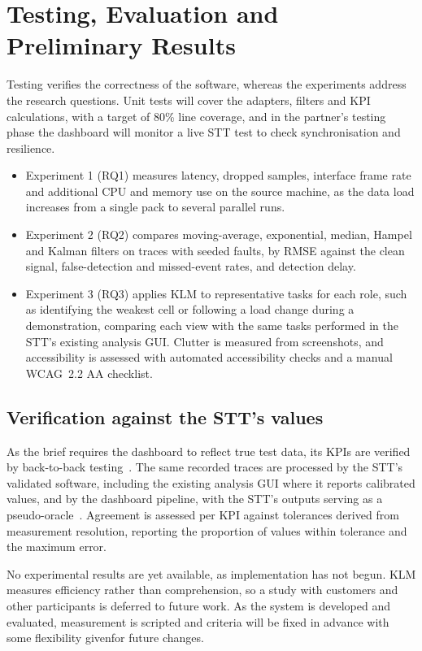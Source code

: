 \section{Testing, Evaluation and Preliminary Results}
\label{sec:evaluation}

Testing verifies the correctness of the software, whereas the experiments address the research questions.
Unit tests will cover the adapters, filters and KPI calculations, with a target of 80\% line coverage, and in the partner's testing phase the dashboard will monitor a live STT test to check synchronisation and resilience.

\begin{itemize}
    \item Experiment 1 (RQ1) measures latency, dropped samples, interface frame rate and additional CPU and memory use on the source machine, as the data load increases from a single pack to several parallel runs.
    \item Experiment 2 (RQ2) compares moving-average, exponential, median, Hampel and Kalman filters on traces with seeded faults, by RMSE against the clean signal, false-detection and missed-event rates, and detection delay.
    \item Experiment 3 (RQ3) applies KLM to representative tasks for each role, such as identifying the weakest cell or following a load change during a demonstration, comparing each view with the same tasks performed in the STT's existing analysis GUI\@.
    Clutter is measured from screenshots, and accessibility is assessed with automated accessibility checks and a manual WCAG~2.2 AA checklist.
\end{itemize}

\subsection{Verification against the STT's values}\label{subsec:kpi-verification}
As the brief requires the dashboard to reflect true test data, its KPIs are verified by back-to-back testing~\cite{vouk1990backtoback}.
The same recorded traces are processed by the STT's validated software, including the existing analysis GUI where it reports calibrated values, and by the dashboard pipeline, with the STT's outputs serving as a pseudo-oracle~\cite{barr2015oracle}.
Agreement is assessed per KPI against tolerances derived from measurement resolution, reporting the proportion of values within tolerance and the maximum error.

No experimental results are yet available, as implementation has not begun.
KLM measures efficiency rather than comprehension, so a study with customers and other participants is deferred to future work.
As the system is developed and evaluated, measurement is scripted and criteria will be fixed in advance with some flexibility givenfor future changes.
